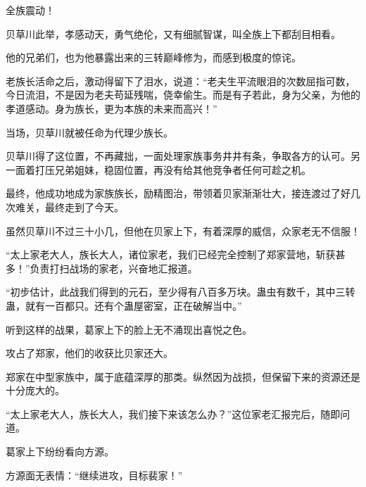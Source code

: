 \begin{this_body}
全族震动！

贝草川此举，孝感动天，勇气绝伦，又有细腻智谋，叫全族上下都刮目相看。

他的兄弟们，也为他暴露出来的三转巅峰修为，而感到极度的惊诧。

老族长活命之后，激动得留下了泪水，说道：“老夫生平流眼泪的次数屈指可数，今日流泪，不是因为老夫苟延残喘，侥幸偷生。而是有子若此，身为父亲，为他的孝道感动。身为族长，更为本族的未来而高兴！”

当场，贝草川就被任命为代理少族长。

贝草川得了这位置，不再藏拙，一面处理家族事务井井有条，争取各方的认可。另一面着打压兄弟姐妹，稳固位置，再没有给其他竞争者任何可趁之机。

最终，他成功地成为家族族长，励精图治，带领着贝家渐渐壮大，接连渡过了好几次难关，最终走到了今天。

虽然贝草川不过三十小几，但他在贝家上下，有着深厚的威信，众家老无不信服！

“太上家老大人，族长大人，诸位家老，我们已经完全控制了郑家营地，斩获甚多！”负责打扫战场的家老，兴奋地汇报道。

“初步估计，此战我们得到的元石，至少得有八百多万块。蛊虫有数千，其中三转蛊，就有一百都只。还有个蛊屋密室，正在破解当中。”

听到这样的战果，葛家上下的脸上无不涌现出喜悦之色。

攻占了郑家，他们的收获比贝家还大。

郑家在中型家族中，属于底蕴深厚的那类。纵然因为战损，但保留下来的资源还是十分庞大的。

“太上家老大人，族长大人，我们接下来该怎么办？”这位家老汇报完后，随即问道。

葛家上下纷纷看向方源。

方源面无表情：“继续进攻，目标裴家！”

\end{this_body}

